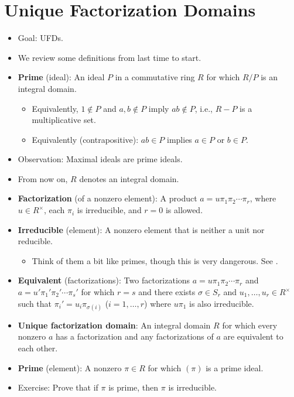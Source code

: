 \documentclass[../notes.tex]{subfiles}
\begin{document}
\section{Unique Factorization Domains}
\begin{itemize}
    \item {}Goal: UFDs.
    \item We review some definitions from last time to start.
    \item \textbf{Prime} (ideal): An ideal $P$ in a commutative ring $R$ for which $R/P$ is an integral domain.
    \begin{itemize}
        \item Equivalently, $1\notin P$ and $a,b\notin P$ imply $ab\notin P$, i.e., $R-P$ is a multiplicative set.
        \item Equivalently (contrapositive): $ab\in P$ implies $a\in P$ or $b\in P$.
    \end{itemize}
    \item Observation: Maximal ideals are prime ideals.
    \item From now on, $R$ denotes an integral domain.
    \item \textbf{Factorization} (of a nonzero element): A product $a=u\pi_1\pi_2\cdots\pi_r$, where $u\in R^\times$, each $\pi_i$ is irreducible, and $r=0$ is allowed.
    \item \textbf{Irreducible} (element): A nonzero element that is neither a unit nor reducible.
    \begin{itemize}
        \item Think of them a bit like primes, though this is very dangerous. See \textcite{bib:DummitFoote}.
    \end{itemize}
    \item \textbf{Equivalent} (factorizations): Two factorizations $a=u\pi_1\pi_2\cdots\pi_r$ and $a=u'\pi_1'\pi_2'\cdots\pi_s'$ for which $r=s$ and there exists $\sigma\in S_r$ and $u_1,\dots,u_r\in R^\times$ such that $\pi_i'=u_i\pi_{\sigma(i)}$ ($i=1,\dots,r$) where $u\pi_1$ is also irreducible.
    \item \textbf{Unique factorization domain}: An integral domain $R$ for which every nonzero $a$ has a factorization and any factorizations of $a$ are equivalent to each other.
    \item \textbf{Prime} (element): A nonzero $\pi\in R$ for which $(\pi)$ is a prime ideal.
    \item Exercise: Prove that if $\pi$ is prime, then $\pi$ is irreducible.

\end{itemize}
\end{document}
